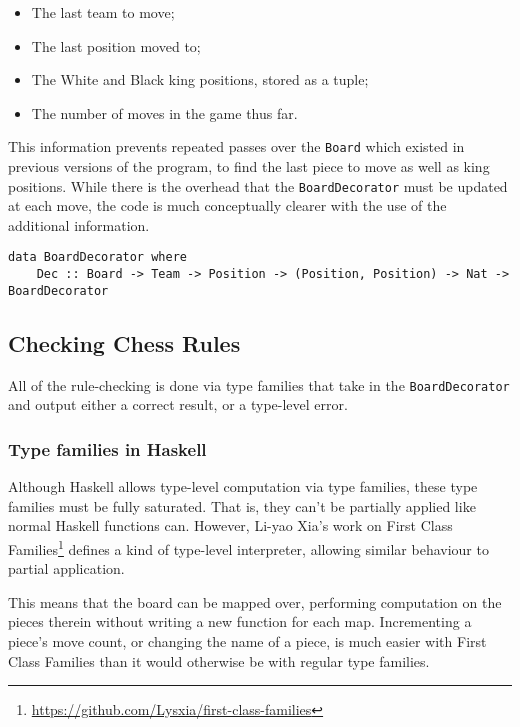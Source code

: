 \documentclass[12pt, a4paper]{scrartcl}
\begin{document}
\begin{itemize}
    \item The last team to move;
    \item The last position moved to;
    \item The White and Black king positions, stored as a tuple;
    \item The number of moves in the game thus far.
\end{itemize}

This information prevents repeated passes over the \lstinline{Board} which existed in previous versions of the program, to find the last piece to move as well as king positions. While there is the overhead that the \lstinline{BoardDecorator} must be updated at each move, the code is much conceptually clearer with the use of the additional information.

\begin{lstlisting}
data BoardDecorator where
    Dec :: Board -> Team -> Position -> (Position, Position) -> Nat -> BoardDecorator
\end{lstlisting}

\subsection{Checking Chess Rules}

All of the rule-checking is done via type families that take in the \lstinline{BoardDecorator} and output either a correct result, or a type-level error.

\subsubsection{Type families in Haskell}

Although Haskell allows type-level computation via type families, these type families must be fully saturated. That is, they can't be partially applied like normal Haskell functions can. However, Li-yao Xia's work on First Class Families\footnote{\url{https://github.com/Lysxia/first-class-families}} defines a kind of type-level interpreter, allowing similar behaviour to partial application.

This means that the board can be mapped over, performing computation on the pieces therein without writing a new function for each map. Incrementing a piece's move count, or changing the name of a piece, is much easier with First Class Families than it would otherwise be with regular type families.
\end{document}
